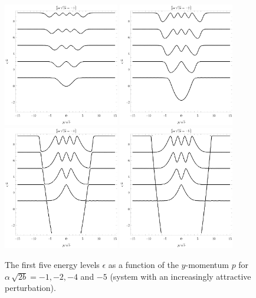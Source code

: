 \begin{figure}[p]
    \centering
    \noindent
    \includegraphics[width=0.45\textwidth]{grafy/dirac-1.pdf}%
    \hspace{0.1\textwidth}%
    \includegraphics[width=0.45\textwidth]{grafy/dirac-2.pdf}%
    \\[2em]%
    \includegraphics[width=0.45\textwidth]{grafy/dirac-4.pdf}%
    \hspace{0.1\textwidth}%
    \includegraphics[width=0.45\textwidth]{grafy/dirac-5.pdf}\par
    \caption{The first five energy levels $\epsilon$ as a function of the $y$-momentum $p$ for $\alpha\,\sqrt{2b} = -1, -2, -4$ and $-5$ (system with an increasingly attractive perturbation).}
    \label{plots-dirac-attractive}
\end{figure}


